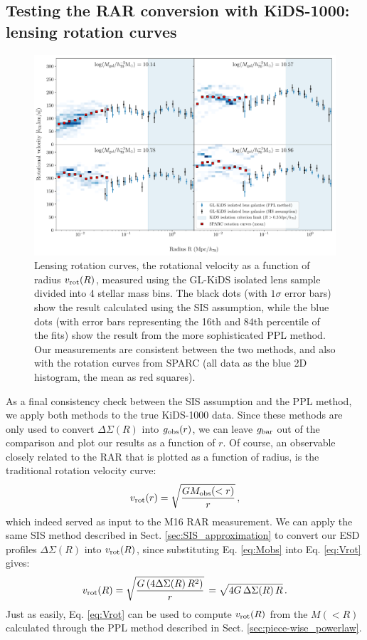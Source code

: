 \documentclass[usenatbib]{mnras}
\newcommand{\un}[1]{_{\rm #1}}
\begin{document}
\subsection{Testing the RAR conversion with KiDS-1000: lensing rotation curves}
\label{sec:results-rotation}

\begin{figure}
	\includegraphics[width=\textwidth]{Figures/ESD_KiDS_massbins-8p5_10p3_10p6_10p8_11p0_iso.pdf}
	\caption{Lensing rotation curves, the rotational velocity as a function of radius $v\un{rot}(R)$, measured using the GL-KiDS isolated lens sample divided into 4 stellar mass bins. The black dots (with $1\sigma$ error bars) show the result calculated using the SIS assumption, while the blue dots (with error bars representing the 16th and 84th percentile of the fits) show the result from the more sophisticated PPL method. Our measurements are consistent between the two methods, and also with the rotation curves from SPARC (all data as the blue 2D histogram, the mean as red squares).}
	\label{fig:Vrot_kids_verlinde_mice}
\end{figure}

As a final consistency check between the SIS assumption and the PPL method, we apply both methods to the true KiDS-1000 data. Since these methods are only used to convert $\Delta\Sigma(R)$ into $g\un{obs}(r)$, we can leave $g\un{bar}$ out of the comparison and plot our results as a function of $r$. Of course, an observable closely related to the RAR that is plotted as a function of radius, is the traditional rotation velocity curve:
\begin{equation}\label{eq:Vrot}
v\un{rot}(r) = \sqrt{\frac{G M\un{obs}(<r)}{r}} \, ,
\end{equation}
which indeed served as input to the M16 RAR measurement. We can apply the same SIS method described in Sect. \ref{sec:SIS_approximation} to convert our ESD profiles $\Delta\Sigma(R)$ into $v\un{rot}(R)$, since substituting Eq. \ref{eq:Mobs} into Eq. \ref{eq:Vrot} gives:
\begin{equation}
v\un{rot}(R) = \sqrt{\frac{G \, (4 \Delta\Sigma(R) \, R^2)}{r}} \, = \sqrt{4 G \, \Delta\Sigma(R) \, R} \, .
\end{equation}
Just as easily, Eq. \ref{eq:Vrot} can be used to compute $v\un{rot}(R)$ from the $M(<R)$ calculated through the PPL method described in Sect. \ref{sec:piece-wise_powerlaw}.
\end{document}
